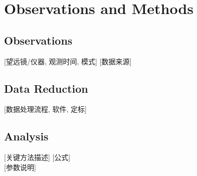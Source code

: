 
\section{Observations and Methods}
\label{sec:method}

\subsection{Observations}
[望远镜/仪器, 观测时间, 模式]
[数据来源]

\subsection{Data Reduction}
[数据处理流程, 软件, 定标]

\subsection{Analysis}
[关键方法描述]
[公式]
\begin{equation}
\label{eq:1}
\end{equation}
[参数说明]
